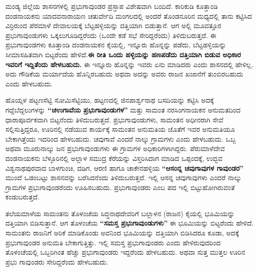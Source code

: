 ಮಂಡ್ಯ ಜಿಲ್ಲೆಯ ಶಾಸನಗಳಲ್ಲಿ ಪ್ರಭುಗಾವುಂಡರ ಪ್ರಸ್ತಾಪ ವಿಶೇಷವಾಗಿ ಬಂದಿದೆ. ಕಾರಿಕುಡಿ ಕೂತ್ತಾಂಡಿ ದಂಡನಾಯಕನು ಯಾದವನಾರಾಯಣ ಚತುರ್ವೇದಿ ಮಂಗಲದಲ್ಲಿ ಅಂದರೆ ತೊಂಡನೂರಿನ ಮಧ್ಯದಲ್ಲಿ ತಾನು ಕಟ್ಟಿಸಿದ ವಿರ್ರಿರುಂದ ಪೆರಮಾಳೆ ದೇವಾಲಯಕ್ಕೆ ಬೆಟ್ಟಹಳ್ಳಿಯನ್ನು ದತ್ತಿಯಾಗಿ ಬಿಡುತ್ತಾನೆ. ಆಗ ಅಲ್ಲಿ ಮೂವತ್ತೂರ ಪ್ರಭುಗಾವುಂಡುಗಳು ಒಕ್ಕಲುಗೂಡಿದ್ದರೆಂದು (ಒಂದೇ ಕಡೆ ಸಭೆ ಸೇರಿದ್ದರೆಂದು) ತಿಳಿದುಬರುತ್ತದೆ. ಈ ಪ್ರಭುಗಾವುಂಡಗಳು ಕೂತ್ತಾಂಡಿ ದಂಡನಾಯಕನ ಕೈಯಲ್ಲಿ, ಇನ್ನೂರು ಹೊನ್ನನ್ನು ಪಡೆದು, ಬೆಟ್ಟಹಳ್ಳಿಯನ್ನು ಸೀಮಾಸಹಿತವಾಗಿ ಬಿಟ್ಟರೆಂದು ಹೇಳಿದೆ.\textbf{ಈ ರೀತಿ ಒಂದು ಹಳ್ಳಿಯನ್ನು ಹಣಪಡೆದು ದತ್ತಿಯಾಗಿ ಬಿಡುವ ಅಧಿಕಾರ ಇವರಿಗೆ ಇದ್ದಿತೆಂದು ಹೇಳಬಹುದು.} ಈ ಇನ್ನೂರು ಹೊನ್ನನ್ನು ಇವರು ಏನು ಮಾಡಿದರು ಎಂದು ಶಾಸನದಲ್ಲಿ ಹೇಳಿಲ್ಲ. ಅದು ಗೌಡಿಕೆಯ ಮರ್ಯಾದೆಯ ಹೊನ್ನಿರಬಹುದು ಅಥವಾ ಅದನ್ನು ಅವರು ರಾಜನ ಖಜಾನೆಗೆ ತುಂಬಿರಬಹುದು ಎಂದು ಹೇಳಬಹುದು.

ಹೊಯ್ಸಳ ಪಟ್ಟಣಸೆಟ್ಟಿ ಸೋಮಿಸೆಟ್ಟಿಯು, ಹಟ್ಟಣದಲ್ಲಿ ಜಿನಪಾರ್ಶ್ವನಾಥ ಬಸದಿಯನ್ನು ಕಟ್ಟಿಸಿ ಅದಕ್ಕೆ ಗದ್ದೆಬೆದ್ದಲು\-ಗಳನ್ನು \textbf{“ಚಉಗಾವೆಯ ಪ್ರಭುಗಾವುಂಡುಗಳ”} ಮತ್ತು ಸಾಮಂತ ನರಸಿಂಗನಾಯಕನ ಅನುಮತದಿಂದ ಧಾರಾಪೂರ್ವಕವಾಗಿ ಬಿಟ್ಟನೆಂದು ತಿಳಿದುಬರುತ್ತದೆ. ಪ್ರಭುಗಾವುಂಡುಗಳು, ಸಾಮಂತನ ಅಧೀನರಾಗಿ ಸೇವೆ ಸಲ್ಲಿಸುತ್ತಿದ್ದರೂ, ಊರಿನಲ್ಲಿ ನಡೆಯುವ ಕಾರ್ಯಕ್ಕೆ ಸಾಮಂತನ ಅನುಮತಿಯ ಜೊತೆಗೆ ಇವರ ಅನುಮತಿಯೂ ಬೇಕಾಗಿತ್ತೆಂದು ಇದರಿಂದ ಹೇಳಬಹುದು. ಚವುಗಾವೆ ಎಂದರೆ ನಾಲ್ಕು ಗ್ರಾಮಗಳು ಎಂದು ಹೇಳಬಹುದು. ಒಬ್ಬ ಅಥವಾ ಮೂರುನಾಲ್ಕು ಜನ ಪ್ರಭುಗಾವುಂಡುಗಳು ಈ ಗ್ರಾಮಗಳ ಅಧಿಕಾರಿಗಳಾಗಿದ್ದರು. ಪೆರುಮಾಳೆದೇವ ದಂಡನಾಯಕನು ಬೆಳ್ಳೂರಿನಲ್ಲಿ ಅಲ್ಲಾಳ ಸಮುದ್ರ ಕೆರೆಯನ್ನು ವಿಸ್ತರಿಸಿದಾಗ ಮಾಡಿದ ಒಪ್ಪಂದಕ್ಕೆ, ಉದ್ಭವ ವಿಶ್ವನಾಥಪುರವಾದ ಬಾಳಗುಂಚಿ, ದಡಿಗ, ಆರಣಿ ಹಾಗೂ ಚಾಕೇನಹಳ್ಳಿಯ \textbf{“ಆಸಂನ್ನ ಚವುಗಾವುಗಳ ಗಾವುಂಡರ”} ಮುಂದೆ ಒಡಂಬಟ್ಟು ಶಾಸನವನ್ನು ಬರೆಸಿದನೆಂದು ತಿಳಿದುಬರುತ್ತದೆ. ಇಲ್ಲಿ ಆಸನ್ನ ಚವುಗಾವುಗಳು ಎಂದರೆ ನಾಲ್ಕು ಗ್ರಾಮಗಳ ಪ್ರಭುಗಾವುಂಡರೆಂದು ಊಹಿಸಬಹುದು. ಪ್ರಭುಗಾವುಂಡರು ಎಂಬ ಪದ ಇಲ್ಲಿ ಬಿಟ್ಟುಹೋಗಿರುವಂತೆ ಕಂಡುಬರುತ್ತದೆ.

ತಲೆಯಮಾಳೆಯ ಸಾಮಂತನು ತೊಳಂಚೆಯ ಸಿದ್ಧನಾಥದೇವರಿಗೆ ಬಲ್ಲಾಳನ (ರಾಜನ) ಕೈಯಲ್ಲಿ ಭೂಮಿಯನ್ನು ದತ್ತಿಯಾಗಿ ಬಿಡಿಸುತ್ತಾನೆ. ಆಗ ತೊಳಂಚೆಯ \textbf{“ಸಮಸ್ತ ಪ್ರಭುಗಾವುಂಡುಗಳು”} ಈ ಭೂಮಿಯನ್ನು ಬಿಟ್ಟರೆಂದು ಹೇಳಿದೆ. ಸಾಮಂತನು ರಾಜನಿಗೆ ಅರಿಕೆ ಮಾಡಿಕೊಂಡು ಅವನಿಂದ ಭೂಮಿಯನ್ನು ದತ್ತಿಯಾಗಿ ಬಿಡಿಸಿದರೂ ಕೂಡಾ, ಅದಕ್ಕೆ ಪ್ರಭುಗಾವುಂಡರ ಅನುಮತಿ ಬೇಕಾಗುತ್ತಿತ್ತು. ಇಲ್ಲಿ ಸಮಸ್ತ ಪ್ರಭುಗಾವುಂಡರು ಎಂದು ಹೇಳಿರುವುದರಿಂದ ತೊಳಂಚೆಯಲ್ಲಿ ಒಬ್ಬರಿಗಿಂತ ಹೆಚ್ಚು ಪ್ರಭುಗಾವುಂಡರು ಇದ್ದರೆಂದು ಹೇಳಬಹುದು. ಅಥವಾ ಸುತ್ತ ಮುತ್ತಲ ಊರಿನ ಪ್ರಭು ಗಾವುಂಡರು ಸೇರಿದ್ದರೆಂದು ಹೇಳಬಹುದು.

